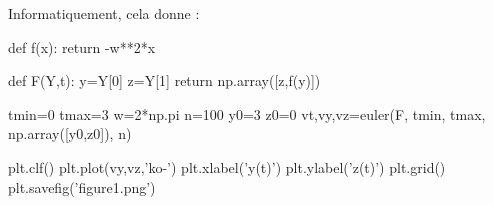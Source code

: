 Informatiquement, cela donne :
\begin{pyverbatim}
def f(x):
    return -w**2*x
    

def F(Y,t):
    y=Y[0]
    z=Y[1]
    return np.array([z,f(y)])
\end{pyverbatim}

\question{}
\begin{pyverbatim}
tmin=0
tmax=3
w=2*np.pi
n=100
y0=3
z0=0
vt,vy,vz=euler(F, tmin, tmax, np.array([y0,z0]), n)

plt.clf()
plt.plot(vy,vz,'ko-')
plt.xlabel('y(t)')
plt.ylabel('z(t)')
plt.grid()
plt.savefig('figure1.png')
\end{pyverbatim}

%
%
%
%
%
%
%
%
%
%
%
%
%
%
%
%

%
%

\question{}

